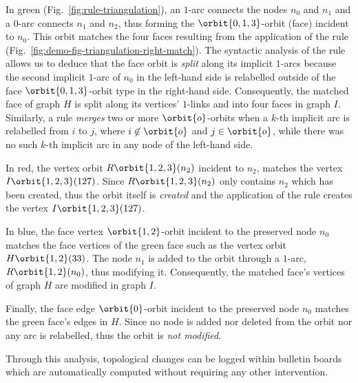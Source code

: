 In green 
(Fig.~\ref{fig:rule-triangulation}), an $1$-arc connects the nodes $n_{0}$ and $n_{1}$ and a $0$-arc
connects $n_{1}$ and $n_{2}$, thus forming the  $\orbit{0,1,3}$-orbit (face) incident to $n_{0}$. %
This orbit matches the four faces resulting from the %
application of the rule 
(Fig.~\ref{fig:demo-fig-triangulation-right-match}). %
The syntactic analysis of the rule allows us to deduce that the face orbit is
\emph{split} along its implicit $1$-arcs because the second implicit $1$-arc of $n_0$ in
the left-hand side is relabelled outside of the face $\orbit{0, 1, 3}$-orbit type
in the right-hand side. %
Consequently, the matched face of graph $H$ is split along its vertices'
$1$-links and into four faces in graph $I$. %
Similarly, a rule \emph{merges} two or more $\orbit{o}$-orbits when a $k$-th implicit arc is relabelled from $i$ to $j$,
where $i\not\in\orbit{o}$ and $j\in\orbit{o}$, while there was no such $k$-th implicit arc
in any node of the left-hand side. %

In red, 
the vertex orbit $R\orbit{1,2,3}(n_{2})$ incident to $n_{2}$, matches the vertex $I\orbit{1,2,3}(127)$.
Since $R\orbit{1,2,3}(n_{2})$ only contains $n_{2}$ which %
has been 
created, thus the orbit 
itself 
is \emph{created} and the %
application of the rule 
creates the vertex $I\orbit{1,2,3}(127)$. %


In blue, 
the face vertex $\orbit{1,2}$-orbit incident to the preserved node
$n_{0}$ matches the face vertices of the 
green face such as the vertex orbit $H\orbit{1,2}(33)$.
The node $n_{1}$ is added to the orbit through a $1$-arc, $R\orbit{1,2}(n_{0})$, 
thus modifying it. %
Consequently, the matched face's vertices of graph $H$ are modified in graph $I$. %

Finally, the face edge $\orbit{0}$-orbit incident to the preserved node $n_{0}$
matches the green face's edges in $H$. %
Since no node is added nor deleted from the orbit nor any arc is relabelled, thus 
the orbit is \emph{not modified}.

Through this
analysis, topological changes can be logged within bulletin boards
which are automatically computed without re\-qui\-ring any other
intervention.

